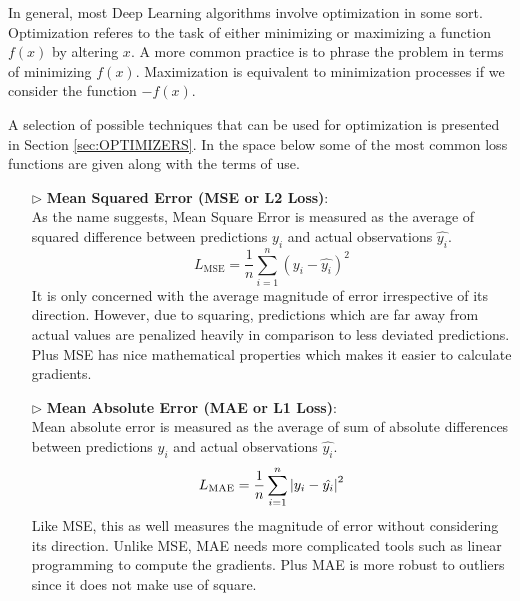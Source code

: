 In general, most Deep Learning algorithms involve optimization in some sort. Optimization referes to the task of either minimizing or maximizing a function $f(x)$ by altering $x$. A more common practice is to phrase the problem in terms of minimizing $f(x)$. Maximization is equivalent to minimization processes if we consider the function $-f(x)$.

A selection of possible techniques that can be used for optimization is presented in Section \ref{sec:OPTIMIZERS}. In the space below some of the most common loss functions are given along with the terms of use.


\begin{itemize}
    \item[$\triangleright$] \textbf{Mean Squared Error (MSE or L2 Loss)}:\\
    As the name suggests, Mean Square Error is measured as the average of squared difference between predictions $y_i$ and actual observations $\hat{y_i}$.
    \begin{equation}
        L_{\mathrm{MSE}} = \frac{1}{n} \sum_{i=1}^{n} (y_i - \hat{y_i})^2
    \end{equation}
    It is only concerned with the average magnitude of error irrespective of its direction. However, due to squaring, predictions which are far away from actual values are penalized heavily in comparison to less deviated predictions. Plus MSE has nice mathematical properties which makes it easier to calculate gradients.
    
    \item[$\triangleright$] \textbf{Mean Absolute Error (MAE or L1 Loss)}:\\
    Mean absolute error is measured as the average of sum of absolute differences between predictions $y_i$ and actual observations $\hat{y_i}$.
    \begin{equation}
        L_{\mathrm{MAE}} = \frac{1}{n} \sum_{i=1}^{n} \left| y_i - \hat{y_i} \right|^2
    \end{equation}
    Like MSE, this as well measures the magnitude of error without considering its direction. Unlike MSE, MAE needs more complicated tools such as linear programming to compute the gradients. Plus MAE is more robust to outliers since it does not make use of square.
    

\end{itemize}

